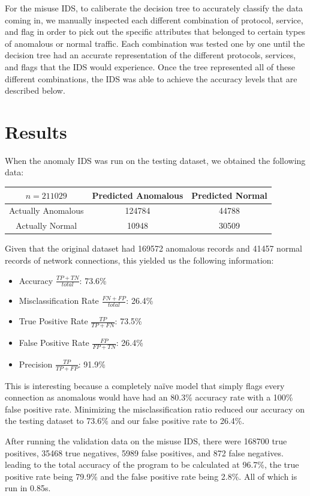 \documentclass[letterpaper,12pt]{article}
\begin{document}
For the misuse IDS, to caliberate the decision tree to accurately classify the
data coming in, we manually inspected each different combination of protocol,
service, and flag in order to pick out the specific attributes that belonged
to certain types of anomalous or normal traffic. Each combination was tested
one by one until the decision tree had an accurate representation of the
different protocols, services, and flags that the IDS would experience. Once
the tree represented all of these different combinations, the IDS was able to
achieve the accuracy levels that are described below.
\section*{Results}
When the anomaly IDS was run on the testing dataset, we obtained the following
data:
\begin{center}
  \begin{tabular}{c|c|c}
    \( n = 211029 \) & Predicted Anomalous & Predicted Normal \\
    \hline
    Actually Anomalous & 124784 & 44788 \\
    \hline
    Actually Normal & 10948 & 30509
  \end{tabular}
\end{center}
Given that the original dataset had 169572 anomalous records and 41457 normal
records of network connections, this yielded us the following information:
\begin{itemize}
  \item Accuracy \( \frac{TP+TN}{total} \): 73.6\%
  \item Misclassification Rate \( \frac{FN+FP}{total} \): 26.4\%
  \item True Positive Rate \( \frac{TP}{TP+FN} \): 73.5\%
  \item False Positive Rate \( \frac{FP}{FP+TN} \): 26.4\%
  \item Precision \( \frac{TP}{TP+FP} \): 91.9\%
\end{itemize}
This is interesting because a completely na\"{i}ve model that simply flags
every connection as anomalous would have had an 80.3\% accuracy rate with a
100\% false positive rate. Minimizing the misclassification ratio reduced our
accuracy on the testing dataset to 73.6\% and our false positive rate to 26.4\%.

After running the validation data on the misuse IDS, there were 168700 true positives,
35468 true negatives, 5989 false positives, and 872 false negatives. leading to the
total accuracy of the program to be calculated at 96.7\%, the true positive rate being
79.9\% and the false positive rate being 2.8\%. All of which is run in 0.85s.
\end{document}
